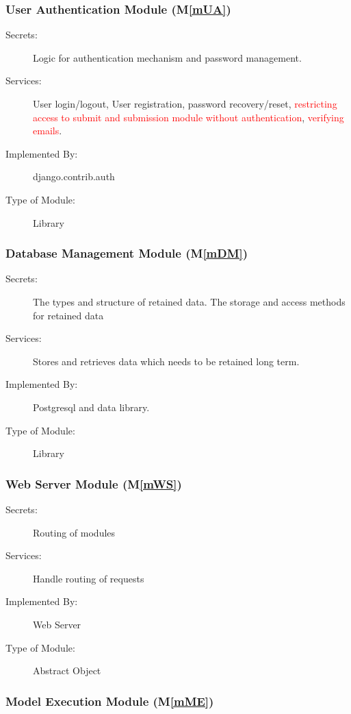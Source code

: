 \documentclass[12pt, titlepage]{article}
\newcommand{\mref}[1]{M\ref{#1}}
\begin{document}
\subsubsection{User Authentication Module (\mref{mUA})}

\begin{description}
\item[Secrets:] Logic for authentication mechanism and password management. 
\item[Services:] User login/logout, User registration, password recovery/reset, \textcolor{red}{restricting access to submit and submission module without authentication}, \textcolor{red}{verifying emails}.
\item[Implemented By:] django.contrib.auth
\item[Type of Module:] Library
\end{description}

\subsubsection{Database Management Module (\mref{mDM})}

\begin{description}
\item[Secrets:]The types and structure of retained data. The storage and access methods for retained data
\item[Services:]Stores and retrieves data which needs to be retained long term.
\item[Implemented By:] Postgresql and data library.
\item[Type of Module:] Library
\end{description}

\subsubsection{Web Server Module (\mref{mWS})}

\begin{description}
\item[Secrets:] Routing of modules
\item[Services:] Handle routing of requests
\item[Implemented By:] Web Server
\item[Type of Module:] Abstract Object
\end{description}

\subsubsection{Model Execution Module (\mref{mME})}
\end{document}
